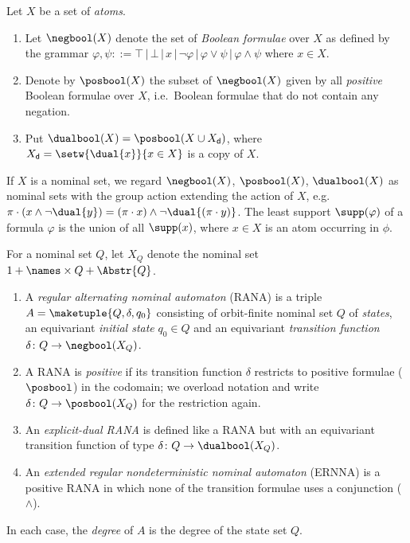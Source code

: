 \documentclass[10pt, final, conference, a4paper, twocolumn]{IEEEtran}
\begin{document}
\begin{defn}\label{defn:boolform}
Let $X$ be a set of \emph{atoms}.
  \begin{enumerate}%
    \item Let $\negbool(X)$ denote
      the set of \emph{Boolean formulae} over $X$ as defined by
      the grammar $\varphi,\psi ::= \top\,\vert\,\bot\,\vert\,x\,\vert\,
      \neg\varphi\,\vert\,\varphi\vee\psi\,\vert\,\varphi\wedge\psi$ where $x\in X$. 
    \item Denote by $\posbool(X)$ the subset of
      $\negbool(X)$ given by all \emph{positive}
      Boolean formulae over $X$, i.e.~Boolean formulae that
      do not contain any negation.
    \item Put $\dualbool(X) = \posbool(X \cup X_\mathsf{d})$,
        where $X_\mathsf{d} = \setw{\dual{x}}{x \in X}$ is a copy of $X$.
    \end{enumerate}
If $X$ is a nominal set, we regard $\negbool(X)$, $\posbool(X)$, $\dualbool(X)$ as nominal sets with the group action extending the action of $X$, e.g.~$\pi\cdot (x\wedge \neg \dual{y}) = (\pi\cdot x)\wedge \neg \dual{(\pi\cdot y)}$.  The least support $\supp(\varphi)$ of a formula $\varphi$ is the union of all $\supp(x)$, where $x\in X$ is an atom occurring in $\phi$. 
\end{defn}
\begin{defn}[RANA]\label{defn:rana}
  For a nominal set $Q$, let $X_Q$ denote the nominal set $1 + \names \times Q + \Abstr{Q}$.
  \begin{enumerate}
    \item A \emph{regular alternating nominal automaton} (RANA) is a triple $A = \maketuple{Q,
        \delta, q_0}$ consisting of
      orbit-finite nominal set $Q$ of \emph{states}, an equivariant \emph{initial state} $q_0 \in Q$ and an equivariant
      \emph{transition function} $\delta \colon Q \to \negbool(X_Q)$.
    \item A RANA is \emph{positive} if its transition function $\delta$ restricts to positive formulae ($\posbool$) in
      the codomain; we overload notation and write $\delta\colon Q \to \posbool(X_Q)$ for the restriction again.
    \item An \emph{explicit-dual RANA} is defined like a RANA but with an equivariant transition function of type
      $\delta\colon Q \to \dualbool(X_Q)$.
    \item An \emph{extended regular nondeterministic nominal automaton} (ERNNA) is a positive RANA in which none of the
      transition formulae uses a conjunction ($\land$).
  \end{enumerate}
In each case, the \emph{degree} of $A$ is the degree of the state set $Q$. 
\end{defn}
\end{document}
